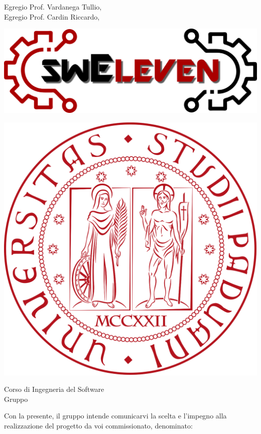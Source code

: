 \documentclass[a4paper, oneside, openany, dvipsnames, table,11pt]{letter}
\begin{document}
\pagestyle{empty}

    \begin{letter}
        { Egregio Prof. Vardanega Tullio,\\Egregio Prof. Cardin Riccardo,}
        \begin{minipage}{.5\textwidth}
            \begin{flushleft}
                \includegraphics[width=.6\linewidth]{../../Shared/logo.png}
            \end{flushleft}
        \end{minipage}
        \begin{minipage}{.4\textwidth}
            \begin{flushright}
                \includegraphics[width=.7\linewidth]{../../Shared/logo unipd.png}
            \end{flushright}
        \end{minipage}
        {    
        \begin{flushleft}
            Corso di Ingegneria del Software\\ Gruppo \Gruppo{}\\ 
        \end{flushleft}
        }
        \opening{ Con la presente, il gruppo \Gruppo{} intende comunicarvi la scelta e l'impegno alla realizzazione del progetto da voi commissionato, denominato:}
        \begin{center}

\end{center}
\end{letter}
\end{document}
